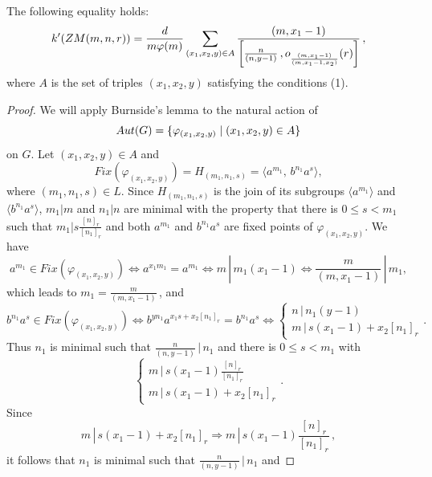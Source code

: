 \documentclass[10pt,a4paper]{amsart}
\def\barr{\begin{array}}
\newcommand{\dd}{\displaystyle }
\def\earr{\end{array}}
\begin{document}
\begin{theorem}
The following equality holds:
\begin{equation}
k'({\rm ZM}(m,n,r))=\dd\frac{d}{m\varphi(m)}\dd\sum_{(x_1,x_2,y)\in A}\frac{(m,x_1-1)}{\left[\frac{n}{(n,y-1)}\,, o_{\frac{(m,x_1-1)}{(m,x_1-1,x_2)}}(r)\right]}\,,
\end{equation}where $A$ is the set of triples $(x_1,x_2,y)$ satisfying the conditions (1).
\end{theorem}

\begin{proof}
We will apply Burnside's lemma to the natural action of $${\rm Aut}(G)=\{\varphi_{(x_1,x_2,y)}\mid (x_1,x_2,y)\in A\}$$on $G$. Let $(x_1,x_2,y)\in A$ and
\begin{equation}
Fix(\varphi_{(x_1,x_2,y)})=H_{(m_1,n_1,s)}=\langle a^{m_1},\, b^{n_1}a^s\rangle,\nonumber
\end{equation}where $(m_1,n_1,s)\in L$. Since $H_{(m_1,n_1,s)}$ is the join of its subgroups $\langle a^{m_1}\rangle$ and $\langle b^{n_1}a^s\rangle$, $m_1|m$ and $n_1|n$ are minimal with the property that there is $0\leq s<m_1$ such that $m_1|s\frac{[n]_r}{[n_1]_r}$ and both $a^{m_1}$ and $b^{n_1}a^s$ are fixed points of $\varphi_{(x_1,x_2,y)}$. We have
\begin{equation}
a^{m_1}\!\in\! Fix(\varphi_{(x_1,x_2,y)})\!\Leftrightarrow\! a^{x_1m_1}\!\!=a^{m_1}\!\Leftrightarrow\! m\,|\,m_1(x_1-1)\!\Leftrightarrow\!\frac{m}{(m,x_1-1)}\,|\,m_1,\nonumber
\end{equation}which leads to $m_1=\frac{m}{(m,x_1-1)}$\,, and
\begin{equation}
b^{n_1}a^s\!\in\! Fix(\varphi_{(x_1,x_2,y)})\!\Leftrightarrow\! b^{yn_1}a^{x_1s+x_2[n_1]_r}\!\!=b^{n_1}a^s\!\Leftrightarrow\!\left\{\barr{lll}
\!\!n\,|\,n_1(y-1)\\
\!\!m\,|\,s(x_1-1)+x_2[n_1]_r\earr\right..\nonumber
\end{equation}Thus $n_1$ is minimal such that $\frac{n}{(n,y-1)}\,|\,n_1$ and there is $0\leq s<m_1$ with
\begin{equation}
\left\{\barr{lll}
\!\!m\,|\,s(x_1-1)\frac{[n]_r}{[n_1]_r}\\
\!\!m\,|\,s(x_1-1)+x_2[n_1]_r\earr\right..\nonumber
\end{equation}Since 
\begin{equation}
m\,|\,s(x_1-1)+x_2[n_1]_r\Rightarrow m\,|\,s(x_1-1)\frac{[n]_r}{[n_1]_r}\,,\nonumber
\end{equation}it follows that $n_1$ is minimal such that $\frac{n}{(n,y-1)}\,|\,n_1$ and

\end{proof}
\end{document}
